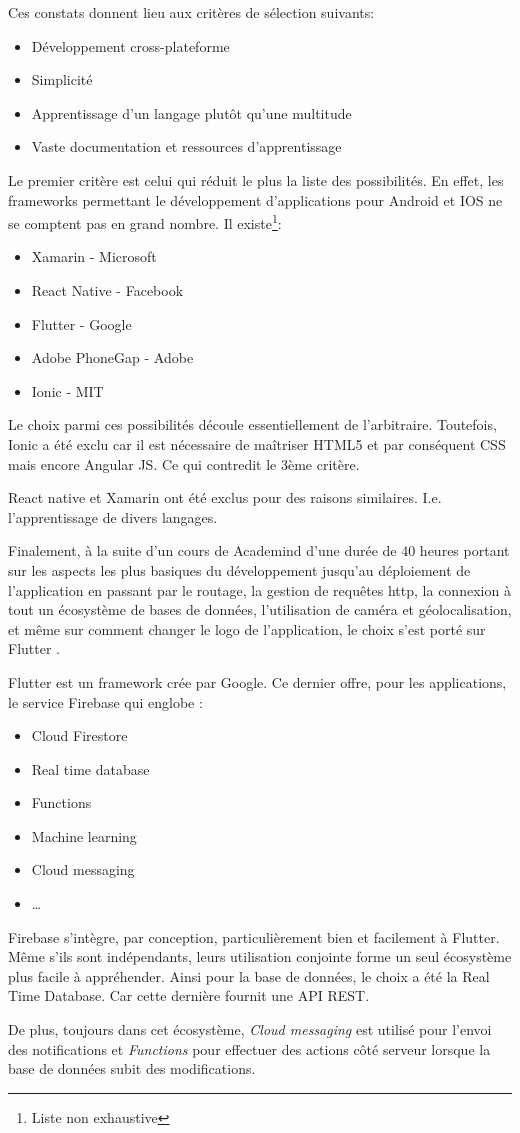 Ces constats donnent lieu aux critères de sélection suivants:
\smallskip
\begin{itemize}
    \item Développement cross-plateforme
    \item Simplicité
    \item Apprentissage d'un langage plutôt qu'une multitude
    \item Vaste documentation et ressources d'apprentissage
\end{itemize}
\smallskip
Le premier critère est celui qui réduit le plus la liste des possibilités. En effet, les frameworks
permettant le développement d'applications pour Android et IOS ne se comptent pas en grand nombre. Il existe\footnote{Liste non exhaustive}:
\smallskip
\begin{itemize}
    \item Xamarin - Microsoft
    \item React Native - Facebook
    \item Flutter - Google \cite{flutter}
    \item Adobe PhoneGap - Adobe
    \item Ionic - MIT
\end{itemize}
\smallskip
Le choix parmi ces possibilités découle essentiellement de l'arbitraire. Toutefois, Ionic a été exclu car il est nécessaire de maîtriser HTML5 et par conséquent CSS mais encore Angular JS. Ce qui contredit le 3ème critère.

React native et Xamarin ont été exclus pour des raisons similaires. I.e. l'apprentissage de divers langages.

Finalement, à la suite d’un cours de Academind d'une durée de 40 heures portant sur les aspects les plus basiques du développement jusqu'au déploiement de l'application en passant par le routage, la gestion de requêtes http, la connexion à tout un écosystème de bases de données, l'utilisation de caméra et géolocalisation, et même sur comment changer le logo de l'application, le choix s'est porté sur Flutter \cite{flutter}.

Flutter est un framework crée par Google. Ce dernier offre, pour les applications, le service Firebase \cite{firebase} qui englobe :

\smallskip
\begin{itemize}
    \item Cloud Firestore
    \item Real time database
    \item Functions
    \item Machine learning
    \item Cloud messaging
    \item \dots
\end{itemize}
\smallskip
Firebase s'intègre, par conception, particulièrement bien et facilement à Flutter. Même s'ils sont
indépendants, leurs utilisation conjointe forme un seul écosystème plus facile à appréhender. Ainsi pour la
base de données, le choix a été la Real Time Database. Car cette dernière fournit une API REST.

De plus, toujours dans cet écosystème, \textit{Cloud messaging} est utilisé pour l'envoi des notifications et \textit{Functions} pour
effectuer des actions côté serveur lorsque la base de données subit des modifications.
